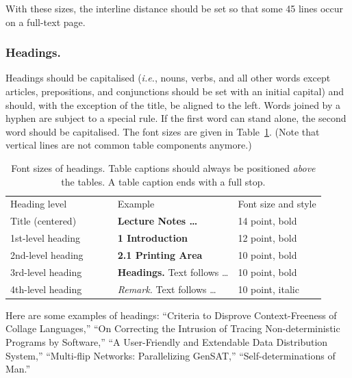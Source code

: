 \documentclass[runningheads]{llncs}
\begin{document}
With these sizes, the interline distance should be set so that some 45
lines occur on a full-text page.

\subsubsection{Headings.}

Headings should be capitalised
({\it i.e.}, nouns, verbs, and all other words
except articles, prepositions, and conjunctions should be set with an
initial capital) and should,
with the exception of the title, be aligned to the left.
Words joined by a hyphen are subject to a special rule. If the first
word can stand alone, the second word should be capitalised.
The font sizes
are given in Table~\ref{table:headings}. (Note that vertical lines
are not common table components anymore.)
%
\setlength{\tabcolsep}{4pt}
\begin{table}
\begin{center}
\caption{
Font sizes of headings. Table captions should always be
positioned {\it above} the tables. A table
caption ends with a full stop.
}
\label{table:headings}
\begin{tabular}{lll}
\hline\noalign{\smallskip}
Heading level $\qquad\qquad$& Example & Font size and style\\
\noalign{\smallskip}
\hline
\noalign{\smallskip}
Title (centered)  & {\Large \bf Lecture Notes \dots} $\qquad$& 14 point, bold\\
1st-level heading & {\large \bf 1 Introduction} & 12 point, bold\\
2nd-level heading & {\bf 2.1 Printing Area} & 10 point, bold\\
3rd-level heading & {\bf Headings.} Text follows \dots & 10 point, bold
\\
4th-level heading & {\it Remark.} Text follows \dots & 10 point,
italic\\
\hline
\end{tabular}
\end{center}
\end{table}
\setlength{\tabcolsep}{1.4pt}

Here are
some examples of headings: ``Criteria to Disprove Context-Freeness of
Collage Languages,'' ``On Correcting the Intrusion of Tracing
Non-deterministic Programs by Software,'' ``A User-Friendly and
Extendable Data Distribution System,'' ``Multi-flip Networks:
Parallelizing GenSAT,'' ``Self-determinations of Man.''
\end{document}
